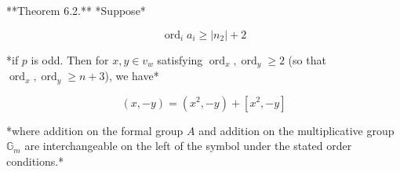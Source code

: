 **Theorem 6.2.** *Suppose*

$$\operatorname{ord}_i a_i \ge |n_2| + 2$$

*if $p$ is odd. Then for $x, y \in v_w$ satisfying $\operatorname{ord}_x, \operatorname{ord}_y \ge 2$ (so that $\operatorname{ord}_x, \operatorname{ord}_y \ge n + 3$), we have*

$$(x, -y) = (x^2, -y) + [x^2, -y]$$

*where addition on the formal group $A$ and addition on the multiplicative group $\mathbb{G}_m$ are interchangeable on the left of the symbol under the stated order conditions.*
